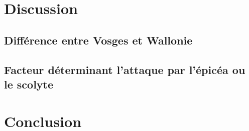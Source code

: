 \documentclass[3p,times]{elsarticle}
\begin{document}





\section{Discussion}

\subsection{Différence entre Vosges et Wallonie}
	
	
	

\subsection{Facteur déterminant l'attaque par l'épicéa ou le scolyte}

	

\section{Conclusion}
\end{document}
